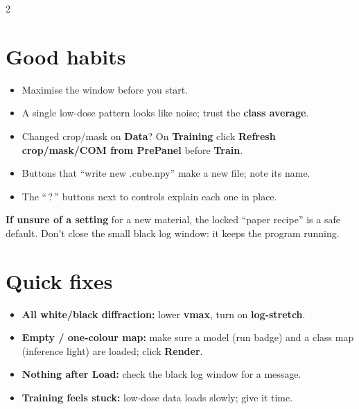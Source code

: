 \documentclass[10pt]{article}
\newcommand{\btn}[1]{\textbf{#1}}
\newcommand{\tabn}[1]{\textsf{\textbf{#1}}}
\begin{document}
\begin{multicols}{2}
\section{Good habits}
\begin{itemize}
\item Maximise the window before you start.
\item A single low-dose pattern looks like noise; trust the \textbf{class average}.
\item Changed crop/mask on \tabn{Data}? On \tabn{Training} click
\btn{Refresh crop/mask/COM from PrePanel} before \btn{Train}.
\item Buttons that ``write new .cube.npy'' make a new file; note its name.
\item The ``\,?\,'' buttons next to controls explain each one in place.
\end{itemize}

\vspace{2pt}
\noindent\colorbox{soft}{\parbox{\dimexpr\linewidth-2\fboxsep}{\footnotesize
\textbf{If unsure of a setting} for a new material, the locked ``paper recipe'' is a
safe default. Don't close the small black log window: it keeps the program running.}}

\section{Quick fixes}
\begin{itemize}
\item \textbf{All white/black diffraction:} lower \btn{vmax}, turn on
\btn{log-stretch}.
\item \textbf{Empty / one-colour map:} make sure a model (run badge) and a class
map (inference light) are loaded; click \btn{Render}.
\item \textbf{Nothing after Load:} check the black log window for a message.
\item \textbf{Training feels stuck:} low-dose data loads slowly; give it time.
\end{itemize}

\end{multicols}
\end{document}
